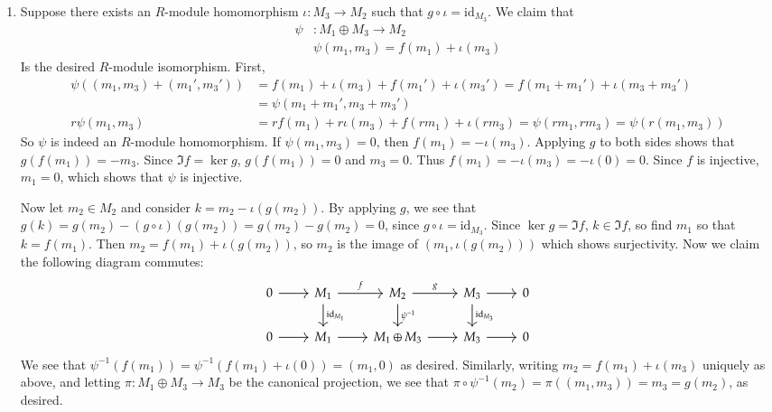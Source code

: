 \documentclass[12pt]{article}
\theoremstyle{definitionstyle}
\newcommand{\id}{\mathrm{id}}
\begin{document}
\begin{enumerate}
\begin{enumerate}
			\item Suppose there exists an $R$-module homomorphism $\iota: M_3 \to M_2$ such that $g \circ \iota = \id_{M_3}$. We claim that 
			\begin{align*}
				\psi&: M_1 \oplus M_3 \to M_2 \\
				&\psi(m_1, m_3) = f(m_1) + \iota(m_3)
			\end{align*}
			Is the desired $R$-module isomorphism. First,
			\begin{align*}
				\psi((m_1, m_3) + (m_1',m_3')) &= f(m_1) + \iota(m_3) + f(m_1') + \iota(m_3') = f(m_1+m_1') + \iota(m_3 + m_3') 
				\\&= \psi(m_1 + m_1', m_3+m_3') \\
				r\psi(m_1, m_3) &= rf(m_1) + r\iota(m_3) + f(rm_1) + \iota(rm_3) = \psi(rm_1, rm_3) = \psi(r(m_1, m_3))
			\end{align*}
			So $\psi$ is indeed an $R$-module homomorphism. If $\psi(m_1, m_3) = 0$, then $f(m_1) = -\iota(m_3)$. Applying $g$ to both sides shows that $g(f(m_1)) = -m_3$. Since $\Im f = \ker g$, $g(f(m_1)) = 0$ and $m_3 = 0$. Thus $f(m_1) = -\iota(m_3) = -\iota(0) = 0$. Since $f$ is injective, $m_1 = 0$, which shows that $\psi$ is injective. 
			
			Now let $m_2 \in M_2$ and consider $k = m_2 - \iota(g(m_2))$. By applying $g$, we see that $g(k) = g(m_2) - (g \circ \iota)(g(m_2)) = g(m_2) - g(m_2) = 0$, since $g \circ \iota = \id_{M_3}$. Since $\ker g = \Im f$, $k \in \Im f$, so find $m_1$ so that $k = f(m_1)$. Then $m_2 = f(m_1) + \iota(g(m_2))$, so $m_2$ is the image of $(m_1, \iota(g(m_2)))$ which shows surjectivity. Now we claim the following diagram commutes:
			\[\begin{tikzcd}
				0 & {M_1} & {M_2} & {M_3} & 0 \\
				0 & {M_1} & {M_1 \oplus M_3} & {M_3} & 0
				\arrow[from=1-4, to=1-5]
				\arrow["g", from=1-3, to=1-4]
				\arrow["f", from=1-2, to=1-3]
				\arrow[from=1-1, to=1-2]
				\arrow[from=2-1, to=2-2]
				\arrow[from=2-2, to=2-3]
				\arrow[from=2-3, to=2-4]
				\arrow[from=2-4, to=2-5]
				\arrow["{\mathrm{id}_{M_3}}", from=1-4, to=2-4]
				\arrow["{\mathrm{id}_{M_1}}", from=1-2, to=2-2]
				\arrow["{\psi^{-1}}", from=1-3, to=2-3]
			\end{tikzcd}\]
			We see that $\psi^{-1}(f(m_1)) = \psi^{-1}(f(m_1) + \iota(0)) = (m_1, 0)$ as desired. Similarly, writing $m_2 = f(m_1) + \iota(m_3)$ uniquely as above, and letting $\pi: M_1 \oplus M_3 \to M_3$ be the canonical projection, we see that $\pi \circ \psi^{-1}(m_2) = \pi((m_1, m_3)) = m_3 = g(m_2)$, as desired.
			

\end{enumerate}
\end{enumerate}
\end{document}
